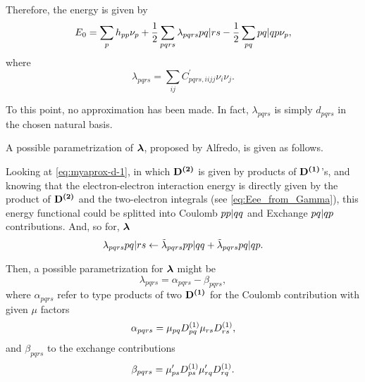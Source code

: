 Therefore, the energy is given by
\begin{equation} \label{eq:myaprox-E0-1}
    E_0 =
    \sum_{p} h_{pp} \nu_p +
    \frac{1}{2} \sum_{pqrs} \lambda_{pqrs} \PBraket{pq | rs}
    - 
    \frac{1}{2} \sum_{pq} \PBraket{pq | qp} \nu_p
    ,
\end{equation}
where 
\begin{equation}
    \lambda_{pqrs} = \sum_{ij} 
    C_{pqrs,iijj}^{\prime} \nu_i \nu_j
    .
\end{equation}

To this point, no approximation has been made. 
In fact, $\lambda_{pqrs}$ is simply $d_{pqrs}$ in the chosen natural basis.

A possible parametrization of $\boldsymbol{\mathrm{\lambda}}$, proposed by Alfredo, is given as follows.

Looking at \cref{eq:myaprox-d-1}, in
which $ \boldsymbol{\mathrm{D^{\left( 2 \right)}}}$ is given by products
of $ \boldsymbol{\mathrm{D^{\left( 1 \right)}}}$'s, and knowing that the electron-electron interaction energy is
directly given by the product of $ \boldsymbol{\mathrm{D^{\left( 2 \right)}}}$ and the two-electron integrals
(see \cref{eq:Eee_from_Gamma}),
this energy functional could be splitted into Coulomb $ \PBraket{pp | qq}$ and
Exchange $ \PBraket{pq | qp}$ contributions.
And, so for, $\boldsymbol{\mathrm{\lambda}}$ 
\begin{equation}
    \lambda_{pqrs} \PBraket{pq | rs}
    \leftarrow
    \tilde{\lambda}_{pqrs} \PBraket{pp | qq}
    +
    \tilde{\lambda}_{pqrs} \PBraket{pq | qp}
    .
\end{equation}

Then, a possible parametrization for $\boldsymbol{\mathrm{\lambda}}$ might be 
\begin{equation}
    \lambda_{pqrs} =
    \alpha_{pqrs}
    -
    \beta_{pqrs}
    ,
\end{equation}
where $\alpha_{pqrs}$ refer to type products of two $ \boldsymbol{\mathrm{D^{\left( 1 \right)}}}$ for the
Coulomb contribution with given $\mu$ factors
\begin{equation}
    \alpha_{pqrs} = \mu_{pq} D^{\left( 1 \right)}_{pq} \mu_{rs} D^{\left( 1 \right)}_{rs} ,
\end{equation} 
and $\beta_{pqrs}$ to the exchange contributions
\begin{equation}
    \beta_{pqrs} = \mu_{ps}^{\prime} D^{\left( 1 \right)}_{ps} \mu_{rq}^{\prime} D^{\left( 1 \right)}_{rq}.
\end{equation} 

